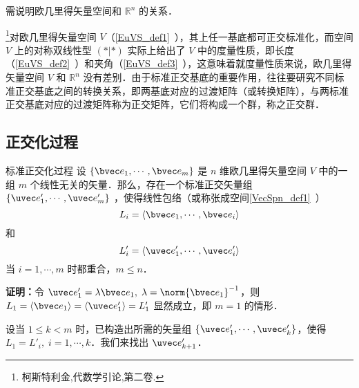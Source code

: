 
\begin{issues}
\issueTODO 需说明欧几里得矢量空间和 $\mathbb{R}^n$ 的关系．
\end{issues}

\footnote{柯斯特利金,代数学引论,第二卷.}对欧几里得矢量空间 $V$（\autoref{EuVS_def1}~），其上任一基底都可正交标准化，而空间 $V$ 上的对称双线性型 $(*|*)$ 实际上给出了 $V$ 中的度量性质，即长度（\autoref{EuVS_def2}~）和夹角（\autoref{EuVS_def3}~），这意味着就度量性质来说，欧几里得矢量空间 $V$ 和 $\mathbb{R}^n$ 没有差别．由于标准正交基底的重要作用，往往要研究不同标准正交基底之间的转换关系，即两基底对应的过渡矩阵（或转换矩阵），与两标准正交基底对应的过渡矩阵称为正交矩阵，它们将构成一个群，称之正交群．
\subsection{正交化过程}
\begin{theorem}{标准正交化过程}\label{EVOIOG_the1}
设 $\{\bvec e_1,\cdots,\bvec e_m\}$ 是 $n$ 维欧几里得矢量空间 $V$ 中的一组 $m$ 个线性无关的矢量．那么，存在一个标准正交矢量组 $\{\uvec e'_1,\cdots,\uvec e'_m\}$ ，使得线性包络（或称张成空间\autoref{VecSpn_def1}~）
\begin{equation}
L_i=\langle\bvec e_1,\cdots,\bvec e_i\rangle
\end{equation}
和
\begin{equation}
L'_i=\langle\uvec e'_1,\cdots,\uvec e'_i\rangle
\end{equation}
当 $i=1,\cdots,m$ 时都重合，$m\leq n$．
\end{theorem}
\textbf{证明：}令 $\uvec e'_1=\lambda\bvec e_1,\;\lambda=\norm{\bvec e_1}^{-1}$，则 $L_1=\langle\bvec e_1\rangle=\langle \uvec e'_1\rangle=L'_1$ 显然成立，即 $m=1$ 的情形．

设当 $1\leq k<m$ 时，已构造出所需的矢量组 $\{\uvec e'_1,\cdots,\uvec e'_k\}$，使得 $L_1=L'_i,\;i=1,\cdots,k$．我们来找出 $\uvec e'_{k+1}$．

